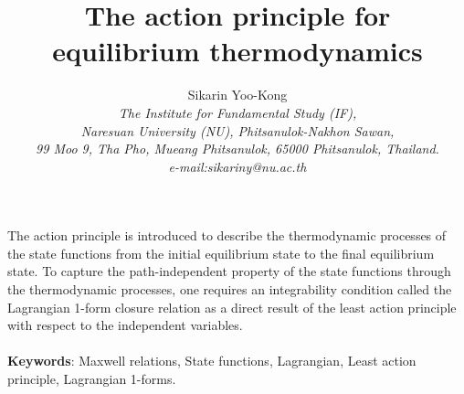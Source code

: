 \documentclass[12pt]{article}
\numberwithin{equation}{section}
\theoremstyle{remark}
\theoremstyle{definition}
\begin{document}
	\title{\textbf{The action principle for equilibrium thermodynamics}}
	\author{Sikarin Yoo-Kong \\	
		\small  \emph{The Institute for Fundamental Study (IF),} \\
		\small\emph{Naresuan University (NU), Phitsanulok-Nakhon Sawan,}\\
		\small  \emph{99 Moo 9, Tha Pho, Mueang Phitsanulok, 65000 Phitsanulok, Thailand.}	\\
        \small\emph{e-mail:\;sikariny@nu.ac.th}
	}
	\date{}
	\maketitle
	\abstract
	The action principle is introduced to describe the thermodynamic processes of the state functions from the initial equilibrium state to the final equilibrium state. %
 To capture the path-independent property of the state functions through the thermodynamic processes, one requires an integrability condition called the Lagrangian 1-form closure relation as a direct result of the least action principle with respect to the independent variables.
	\\
	\\
	\textbf{Keywords}: Maxwell relations, State functions, Lagrangian, Least action principle, Lagrangian 1-forms.
	
\end{document}
